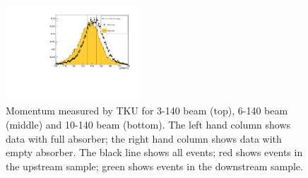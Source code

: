 \begin{figure}[!tbh]
    \includegraphics*[width=0.45\textwidth]{02-Cuts/Figures/2017-2.7_10-140_lH2_empty/tku_p_us_cut.pdf}
    \caption{Momentum measured by TKU for 3-140 beam (top), 6-140 beam (middle) and 10-140 beam (bottom).
    The left hand column shows data with full absorber; the right hand column shows data with empty absorber.
    The black line shows all events; red shows events in the upstream sample; green shows events in the downstream sample.
\label{fig:tku_mom}}
\end{figure}


